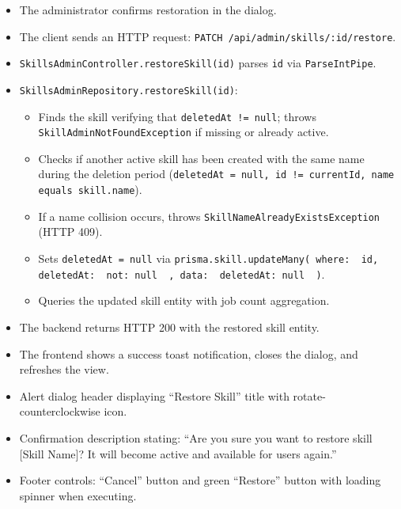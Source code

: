 \begin{itemize}[leftmargin=1.6em,topsep=3pt,itemsep=2pt,parsep=0pt,label=$\bullet$]
    \item The administrator confirms restoration in the dialog.
    \item The client sends an HTTP request: \texttt{PATCH /api/admin/skills/:id/restore}.
    \item \texttt{SkillsAdminController.restoreSkill(id)} parses \texttt{id} via \texttt{ParseIntPipe}.
    \item \texttt{SkillsAdminRepository.restoreSkill(id)}:
        \begin{itemize}[leftmargin=1.6em,topsep=2pt,itemsep=2pt,parsep=0pt]
            \item Finds the skill verifying that \texttt{deletedAt != null}; throws \texttt{SkillAdmin\-Not\-Found\-Exception} if missing or already active.
            \item Checks if another active skill has been created with the same name during the deletion period (\texttt{deletedAt = null, id != currentId, name equals skill.name}).
            \item If a name collision occurs, throws \texttt{SkillName\-Already\-Exists\-Exception} (HTTP 409).
            \item Sets \texttt{deletedAt = null} via \texttt{prisma.skill.updateMany({ where: { id, deletedAt: { not: null } }, data: { deletedAt: null } })}.
            \item Queries the updated skill entity with job count aggregation.
        \end{itemize}
    \item The backend returns HTTP 200 with the restored skill entity.
    \item The frontend shows a success toast notification, closes the dialog, and refreshes the view.
\end{itemize}

\begin{itemize}[leftmargin=1.6em,topsep=3pt,itemsep=2pt,parsep=0pt,label=$\bullet$]
    \item Alert dialog header displaying ``Restore Skill'' title with rotate-counterclockwise icon.
    \item Confirmation description stating: ``Are you sure you want to restore skill [Skill Name]? It will become active and available for users again.''
    \item Footer controls: ``Cancel'' button and green ``Restore'' button with loading spinner when executing.
\end{itemize}

